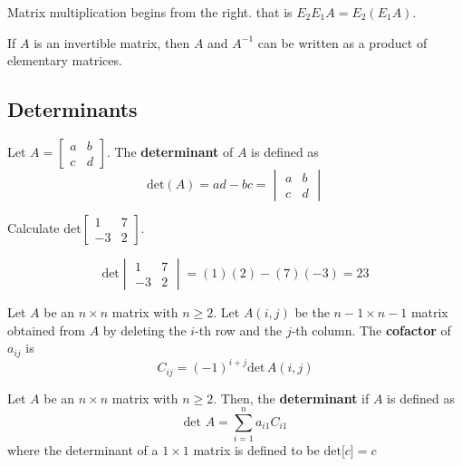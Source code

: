 \documentclass[english, 12pt]{article}
\begin{document}
\begin{qte}
Matrix multiplication begins from the right. that is $E_2E_1A = E_2(E_1A)$.
\end{qte}

\begin{thrm}
If $A$ is an invertible matrix, then $A$ and $A^{-1}$ can be written as a product of elementary matrices.
\end{thrm}

\subsection{Determinants}

\begin{defn}
Let $A = \begin{bmatrix} a & b \\ c & d \end{bmatrix}$. The \textbf{determinant} of $A$ is defined as
\[\text{det}(A) = ad-bc = \begin{vmatrix} a & b \\ c & d \end{vmatrix}\]
\end{defn}

\begin{exmp}
Calculate $\text{det}\begin{bmatrix} 1 & 7 \\ -3 & 2 \end{bmatrix}$.
\begin{sol}
\[\text{det}\begin{vmatrix} 1 & 7 \\ -3 & 2 \end{vmatrix} = (1)(2) - (7)(-3) = 23\]
\end{sol}
\end{exmp}

\begin{defn}
Let $A$ be an $n \times n$ matrix with $n \geq 2$. Let $A(i,j)$ be the $n-1 \times n-1$ matrix obtained from $A$ by deleting the $i$-th row and the $j$-th column. The \textbf{cofactor} of $a_{ij}$ is
\[C_{ij} = (-1)^{i+j} \text{det}\,A(i,j)\]
\end{defn}

\begin{defn}
Let $A$ be an $n \times n$ matrix with $n \geq 2$. Then, the \textbf{determinant} if $A$ is defined as
\[\text{det }A = \sum_{i=1}^n a_{i1}C_{i1}\]
where the determinant of a $1 \times 1$ matrix is defined to be $\text{det}\lbrack c\rbrack = c$
\end{defn}
\end{document}
